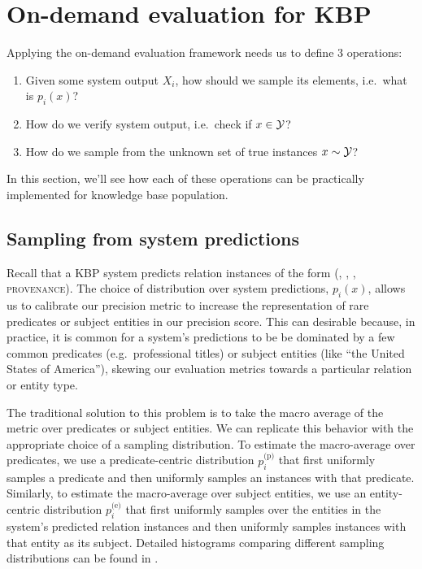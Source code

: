 \section{On-demand evaluation for KBP}
\label{sec:application}
Applying the on-demand evaluation framework needs us to define 3 operations:
\begin{enumerate}
  \item Given some system output $X_i$, how should we sample its elements, i.e.\ what is $p_i(x)$?
  \item How do we verify system output, i.e.\ check if $x \in \mathcal{Y}$?
  \item How do we sample from the unknown set of true instances $x \sim \mathcal{Y}$?
\end{enumerate}
In this section, we'll see how each of these operations can be practically implemented for knowledge base population.

\subsection{Sampling from system predictions}
Recall that a KBP system predicts relation instances of the form (, , , \textsc{provenance}).
The choice of distribution over system predictions, $p_i(x)$, allows us to calibrate our precision metric to increase the representation of rare predicates or subject entities in our precision score.
This can desirable because, in practice, it is common for a system's predictions to be be dominated by a few common predicates (e.g.\ professional titles) or subject entities (like ``the United States of America''), skewing our evaluation metrics towards a particular relation or entity type.

The traditional solution to this problem is to take the macro average of the metric over predicates or subject entities.
We can replicate this behavior with the appropriate choice of a sampling distribution.
To estimate the macro-average over predicates, we use a predicate-centric distribution $p_i^\text{(p)}$ that first uniformly samples a predicate and then uniformly samples an instances with that predicate.
Similarly, to estimate the macro-average over subject entities, we use an entity-centric distribution $p_i^\text{(e)}$ that first uniformly samples over the entities in the system's predicted relation instances and then uniformly samples instances with that entity as its subject.
Detailed histograms comparing different sampling distributions can be found in .

